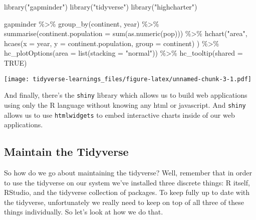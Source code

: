 \documentclass[
]{article}
\newenvironment{Shaded}{\begin{snugshade}}{\end{snugshade}}
\newcommand{\AttributeTok}[1]{\textcolor[rgb]{0.77,0.63,0.00}{#1}}
\newcommand{\ConstantTok}[1]{\textcolor[rgb]{0.00,0.00,0.00}{#1}}
\newcommand{\FunctionTok}[1]{\textcolor[rgb]{0.00,0.00,0.00}{#1}}
\newcommand{\NormalTok}[1]{#1}
\newcommand{\SpecialCharTok}[1]{\textcolor[rgb]{0.00,0.00,0.00}{#1}}
\newcommand{\StringTok}[1]{\textcolor[rgb]{0.31,0.60,0.02}{#1}}
\begin{document}
\begin{Shaded}
\begin{Highlighting}[]
\FunctionTok{library}\NormalTok{(}\StringTok{"gapminder"}\NormalTok{)}
\FunctionTok{library}\NormalTok{(}\StringTok{"tidyverse"}\NormalTok{)}
\FunctionTok{library}\NormalTok{(}\StringTok{"highcharter"}\NormalTok{)}

\NormalTok{gapminder }\SpecialCharTok{\%\textgreater{}\%}
  \FunctionTok{group\_by}\NormalTok{(continent, year) }\SpecialCharTok{\%\textgreater{}\%}
  \FunctionTok{summarise}\NormalTok{(}\AttributeTok{continent.population =} \FunctionTok{sum}\NormalTok{(}\FunctionTok{as.numeric}\NormalTok{(pop))) }\SpecialCharTok{\%\textgreater{}\%}
  \FunctionTok{hchart}\NormalTok{(}\StringTok{"area"}\NormalTok{,}
         \FunctionTok{hcaes}\NormalTok{(}\AttributeTok{x =}\NormalTok{ year, }
               \AttributeTok{y =}\NormalTok{ continent.population, }
               \AttributeTok{group =}\NormalTok{ continent)}
\NormalTok{         ) }\SpecialCharTok{\%\textgreater{}\%}
  \FunctionTok{hc\_plotOptions}\NormalTok{(}\AttributeTok{area =} \FunctionTok{list}\NormalTok{(}\AttributeTok{stacking =} \StringTok{"normal"}\NormalTok{)) }\SpecialCharTok{\%\textgreater{}\%}
  \FunctionTok{hc\_tooltip}\NormalTok{(}\AttributeTok{shared =} \ConstantTok{TRUE}\NormalTok{)}
\end{Highlighting}
\end{Shaded}

\texttt{[image: tidyverse-learnings\_files/figure-latex/unnamed-chunk-3-1.pdf]}

And finally, there's the \texttt{shiny} library which allows us to build web applications using only the R language without knowing any html or javascript. And \texttt{shiny} allows us to use \texttt{htmlwidgets} to embed interactive charts inside of our web applications.

\hypertarget{maintain-the-tidyverse}{%
\subsection{Maintain the Tidyverse}\label{maintain-the-tidyverse}}

So how do we go about maintaining the tidyverse? Well, remember that in order to use the tidyverse on our system we've installed three discrete things: R itself, RStudio, and the tidyverse collection of packages. To keep fully up to date with the tidyverse, unfortunately we really need to keep on top of all three of these things individually. So let's look at how we do that.
\end{document}
